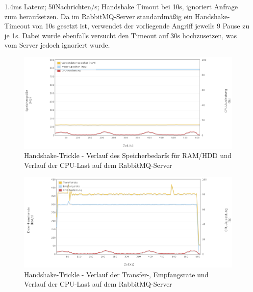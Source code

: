 \documentclass[	a4paper,
			11pt,
			oneside,
			parskip]{scrartcl}
\begin{document}
	
	\clearpage
		{%
		  \newline
		  \newline
		  \newline
		}{%
		 1.4ms Latenz; 50Nachrichten/s; Handshake Timout bei 10s, ignoriert Anfrage zum heraufsetzen.
		}{%
		 Da im RabbitMQ-Server standardmäßig ein Handshake-Timeout von 10s gesetzt ist, verwendet der vorliegende Angriff jeweils 9 Pause
		 zu je 1s. Dabei wurde ebenfalls versucht den Timeout auf 30s hochzusetzen, was vom Server jedoch ignoriert wurde.
		}
		
		\begin{figure}[!htb]
			\centering
			\includegraphics[width=\textwidth]{img/handshake/handshake_server1.png}
			\caption{Handshake-Trickle - Verlauf des Speicherbedarfs für RAM/HDD und Verlauf der CPU-Last auf dem RabbitMQ-Server}
			\label{fig:handshake-server1}
		\end{figure}
		
		\begin{figure}[!htb]
			\centering
			\includegraphics[width=\textwidth]{img/handshake/handshake_server2.png}
			\caption{Handshake-Trickle - Verlauf der Transfer-, Empfangsrate und Verlauf der CPU-Last auf dem RabbitMQ-Server}
			\label{fig:handshake-server2}
		\end{figure}
		
\end{document}
